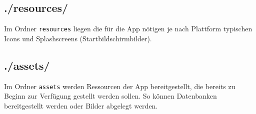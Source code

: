 \subsection*{./resources/}
Im Ordner \texttt{resources} liegen die für die App nötigen je nach Plattform typischen Icons und Splashscreens (Startbildschirmbilder). 
%
\subsection*{./assets/}
Im Ordner \texttt{assets} werden Ressourcen der App bereitgestellt, die bereits zu Beginn zur Verfügung gestellt werden sollen. So können Datenbanken bereitgestellt werden oder Bilder abgelegt werden.
%
